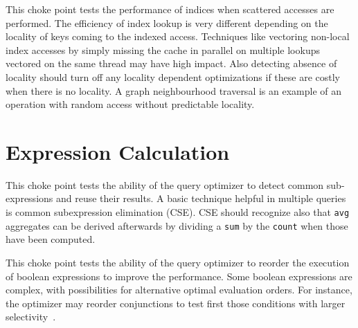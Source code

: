 



This choke point tests the performance of indices when scattered accesses are performed. The efficiency of index lookup is very different depending on the locality of keys coming to the indexed access.
Techniques like vectoring non-local index accesses by simply missing the cache in parallel on multiple lookups vectored on the same thread may have high impact.
Also detecting absence of locality should turn off any locality dependent optimizations if these are costly when there is no locality. A graph neighbourhood traversal is an example of an operation with random access without predictable locality.




\section{Expression Calculation}



This choke point tests the ability of the query optimizer to detect common sub-expressions and reuse their results. A basic technique helpful in multiple queries is common subexpression elimination (CSE).
CSE should recognize also that \lstinline{avg} aggregates can be derived afterwards by dividing a \lstinline{sum} by the \lstinline{count} when those have been computed.





This choke point tests the ability of the query optimizer to reorder the execution of boolean expressions to improve the performance. Some boolean expressions are complex, with possibilities for alternative optimal evaluation orders.
For instance, the optimizer may reorder conjunctions to test first those conditions with larger selectivity~\cite{DBLP:conf/vldb/Moerkotte98}.

